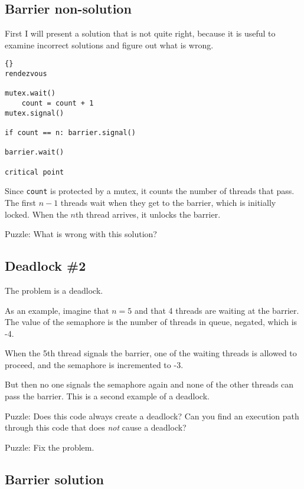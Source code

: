 \documentclass{book}
\newcommand{\clearemptydoublepage}{\newpage\cleardoublepage}
\begin{document}
\subsection {Barrier non-solution}

First I will present a solution that is not quite right, because
it is useful to examine incorrect solutions and figure out what
is wrong.

\begin{lstlisting}[title={Barrier non-solution}]{}
rendezvous

mutex.wait()
    count = count + 1
mutex.signal()

if count == n: barrier.signal()

barrier.wait()

critical point
\end{lstlisting}

Since {\tt count} is protected by a mutex, it counts the number of
threads that pass.  The first $n-1$ threads wait when they get to the
barrier, which is initially locked.  When the $n$th thread arrives, it
unlocks the barrier.

Puzzle:  What is wrong with this solution?


\clearemptydoublepage
\subsection{Deadlock \#2}

The problem is a deadlock.

As an example, imagine that $n=5$
and that 4 threads are waiting at the barrier.  The value
of the semaphore is the number of threads in queue, negated, 
which is -4.

When the 5th thread signals the barrier, one of the waiting
threads is allowed to proceed, and the semaphore is incremented
to -3.

But then no one signals the semaphore again and none of the
other threads can pass the barrier.
This is a second example of a deadlock.

Puzzle: Does this code always create a deadlock?  Can you find an
execution path through this code that does {\em not} cause a deadlock?

Puzzle: Fix the problem.


\clearemptydoublepage
\subsection{Barrier solution}
\label{barrier}
\end{document}
